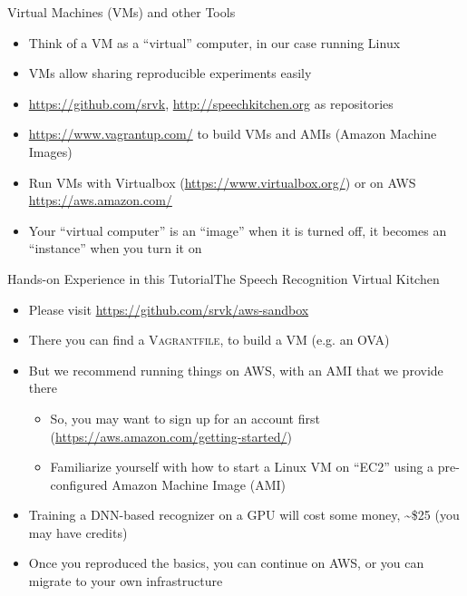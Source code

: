 \begin{frame}{Virtual Machines (VMs) and other Tools}
  \begin{itemize}
  \item Think of a VM as a ``virtual'' computer, in our case running Linux
  \item VMs allow sharing reproducible experiments easily
  \item \url{https://github.com/srvk}, \url{http://speechkitchen.org} as repositories
  \item \url{https://www.vagrantup.com/} to build VMs and AMIs (Amazon Machine Images)
  \item Run VMs with Virtualbox (\url{https://www.virtualbox.org/}) or on AWS \url{https://aws.amazon.com/}
  \item Your ``virtual computer'' is an ``image'' when it is turned off, it becomes an ``instance'' when you turn it on
  \end{itemize}
\end{frame}

\begin{frame}{Hands-on Experience in this Tutorial}{The Speech Recognition Virtual Kitchen}
  \begin{itemize}
  \item Please visit \url{https://github.com/srvk/aws-sandbox}
  \item There you can find a \textsc{Vagrantfile}, to build a VM (e.g. an OVA)
  \item But we recommend running things on AWS, with an \textsc{AMI} that we provide there
    \begin{itemize}
    \item So, you may want to sign up for an account first (\url{https://aws.amazon.com/getting-started/})
    \item Familiarize yourself with how to start a Linux VM on ``EC2'' using a pre-configured Amazon Machine Image (AMI)
    \end{itemize}
  \item Training a DNN-based recognizer on a GPU will cost some money, \textasciitilde \$25 (you may have credits)
  \item Once you reproduced the basics, you can continue on AWS, or you can migrate to your own infrastructure
  \end{itemize}
\end{frame}


